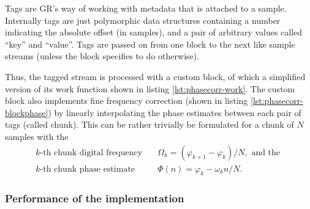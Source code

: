 Tags are GR's way of working with metadata that is attached to a sample. Internally tags are just polymorphic data structures containing a number indicating the absolute offset (in samples), and a pair of arbitrary values called ``key'' and ``value''. Tags are passed on from one block to the next like sample streams (unless the block specifies to do otherwise).

Thus, the tagged stream is processed with a custom block, of which a simplified version of its work function shown in listing \ref{lst:phasecorr-work}. The custom block also implements fine frequency correction (shown in listing \ref{lst:phasecorr-blockphase}) by linearly interpolating the phase estimates between each pair of tags (called chunk). This can be rather trivially be formulated for a chunk of \(N\) samples with the
\begin{subequations}
	\begin{align}
		k\text{-th chunk digital frequency} \quad  & \Omega_k = (\varphi_{k+1} - \varphi_k) / N, \text{ and the }\\
		k\text{-th chunk phase estimate} \quad & \Phi(n) = \varphi_k - \omega_k n/N.
	\end{align}
\end{subequations}

\subsubsection{Performance of the implementation}\label{sec:preforming-implementation}

